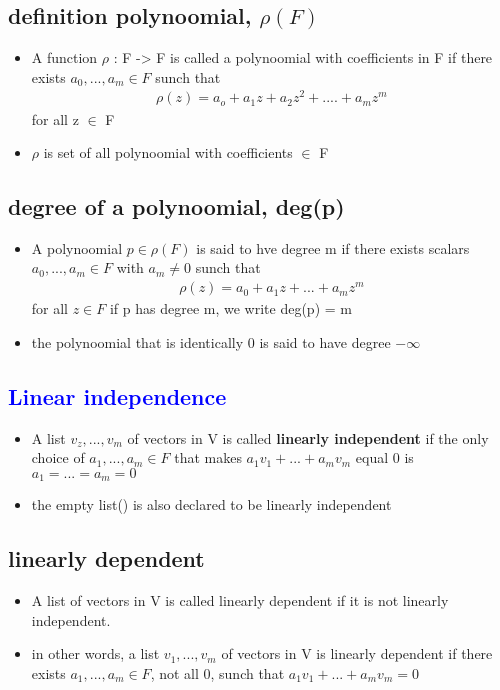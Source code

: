 \documentclass[a4paper,12pt]{article}
\begin{document}
    \subsection{definition \textbf{polynoomial,} $\rho(F)$}
    \begin{itemize}
        \item A function $\rho$ : F -> F is called a polynoomial with coefficients in F if 
        there exists $a_0,...,a_m \in F$ sunch that
        \begin{align*}
            \rho(z) = a_o + a_1z + a_2z^2 + .... +a_mz^m
        \end{align*} 
        for all z $\in$ F
        \item $\rho$ is set of all polynoomial with coefficients $\in$ F
    \end{itemize}
    \subsection{\textbf{degree of a polynoomial,} deg(p)}
    \begin{itemize}
        \item A polynoomial $p \in \rho(F)$ is said to hve degree m if 
        there exists scalars $a_0,...,a_m \in F$ with $a_m \neq 0$ sunch that
        \begin{align*}
            \rho(z) = a_0 + a_1z +...+ a_mz^m
        \end{align*}
        for all $z \in F$ if p has degree m, we write deg(p) = m
        \item the polynoomial that is identically 0 is said to have degree $-\infty$
    \end{itemize}
    \subsection{\textcolor{blue}{Linear independence}}
    \begin{itemize}
        \item A list $v_z,...,v_m$ of vectors in V is called \textbf{linearly independent} if the 
        only choice of $a_1,...,a_m \in F$ that makes $a_1v_1 + ... + a_mv_m$ equal 0 is $a_1 = ... = a_m = 0$
        \item the empty list() is also declared to be linearly independent
    \end{itemize}
    \subsection{\textbf{linearly dependent}}
    \begin{itemize}
        \item A list of vectors in V is called linearly dependent if it is not linearly independent.
        \item  in other words, a list $v_1,...,v_m$ of vectors in V is linearly dependent if there exists
        $a_1,...,a_m \in F$, not all 0, sunch that $a_1v_1 + ... + a_mv_m = 0$ 
    \end{itemize}
\end{document}
